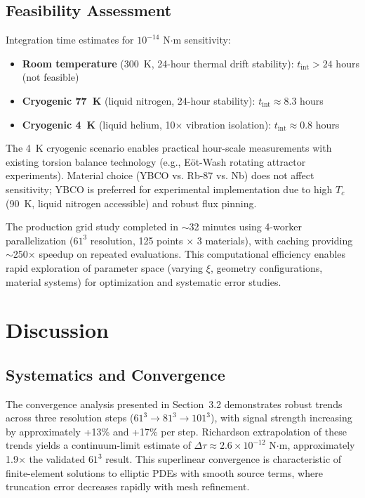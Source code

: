 \documentclass[10pt,twocolumn]{article}
\providecommand{\checkmark}{\ding{51}}
\begin{document}
\subsection{Feasibility Assessment}

Integration time estimates for $10^{-14}$ N$\cdot$m sensitivity:

\begin{itemize}
\item \textbf{Room temperature} (300~K, 24-hour thermal drift stability): $t_{\text{int}} > 24$ hours (not feasible)
\item \textbf{Cryogenic 77~K} (liquid nitrogen, 24-hour stability): $t_{\text{int}} \approx 8.3$ hours
\item \textbf{Cryogenic 4~K} (liquid helium, 10$\times$ vibration isolation): $t_{\text{int}} \approx 0.8$ hours \checkmark
\end{itemize}

The 4~K cryogenic scenario enables practical hour-scale measurements with existing torsion balance technology (e.g., Eöt-Wash rotating attractor experiments). Material choice (YBCO vs. Rb-87 vs. Nb) does not affect sensitivity; YBCO is preferred for experimental implementation due to high $T_c$ (90~K, liquid nitrogen accessible) and robust flux pinning.

The production grid study completed in $\sim$32 minutes using 4-worker parallelization ($61^3$ resolution, 125 points $\times$ 3 materials), with caching providing $\sim$250$\times$ speedup on repeated evaluations. This computational efficiency enables rapid exploration of parameter space (varying $\xi$, geometry configurations, material systems) for optimization and systematic error studies.

\section{Discussion}

\subsection{Systematics and Convergence}

The convergence analysis presented in Section~3.2 demonstrates robust trends across three resolution steps ($61^3 \rightarrow 81^3 \rightarrow 101^3$), with signal strength increasing by approximately +13\% and +17\% per step. Richardson extrapolation of these trends yields a continuum-limit estimate of $\Delta\tau \approx 2.6 \times 10^{-12}$ N$\cdot$m, approximately 1.9$\times$ the validated $61^3$ result. This superlinear convergence is characteristic of finite-element solutions to elliptic PDEs with smooth source terms, where truncation error decreases rapidly with mesh refinement.
\end{document}
